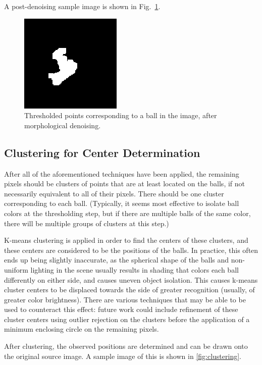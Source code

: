\documentclass[letterpaper, 10 pt, conference]{ieeeconf}  %
\begin{document}
A post-denoising sample image is shown in Fig.~\ref{fig:denoised}.

\begin{figure}
\centering
    \includegraphics{denoised.png}
    \caption{Thresholded points corresponding to a ball in the image, after morphological denoising.}
    \label{fig:denoised}
\end{figure}

\subsection{Clustering for Center Determination}

After all of the aforementioned techniques have been applied, the remaining pixels should be clusters of points that are at least located on the balls, if not necessarily equivalent to all of their pixels. There should be one cluster corresponding to each ball. (Typically, it seems most effective to isolate ball colors at the thresholding step, but if there are multiple balls of the same color, there will be multiple groups of clusters at this step.)

K-means clustering is applied in order to find the centers of these clusters, and these centers are considered to be the positions of the balls. In practice, this often ends up being slightly inaccurate, as the spherical shape of the balls and non-uniform lighting in the scene usually results in shading that colors each ball differently on either side, and causes uneven object isolation. This causes k-means cluster centers to be displaced towards the side of greater recognition (usually, of greater color brightness). There are various techniques that may be able to be used to counteract this effect: future work could include refinement of these cluster centers using outlier rejection on the clusters before the application of a minimum enclosing circle on the remaining pixels.

After clustering, the observed positions are determined and can be drawn onto the original source image. A sample image of this is shown in \ref{fig:clustering}.
\end{document}
